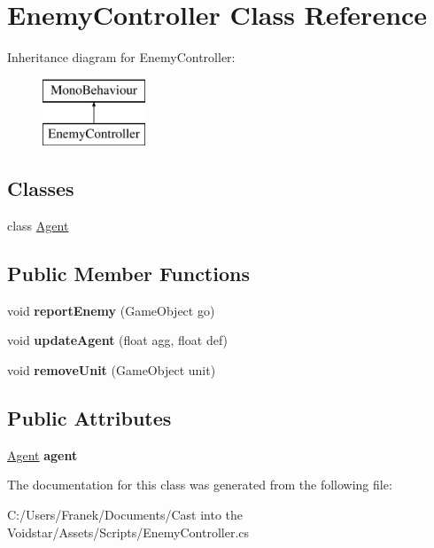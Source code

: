 \hypertarget{class_enemy_controller}{}\section{Enemy\+Controller Class Reference}
\label{class_enemy_controller}
Inheritance diagram for Enemy\+Controller\+:\begin{figure}[H]
\begin{center}
\leavevmode
\includegraphics[height=2.000000cm]{class_enemy_controller}
\end{center}
\end{figure}
\subsection*{Classes}
\begin{DoxyCompactItemize}
\item 
class \hyperlink{class_enemy_controller_1_1_agent}{Agent}
\end{DoxyCompactItemize}
\subsection*{Public Member Functions}
\begin{DoxyCompactItemize}
\item 
\hypertarget{class_enemy_controller_a068a88160e180f49bdc2da319db95b41}{}void {\bfseries report\+Enemy} (Game\+Object go)\label{class_enemy_controller_a068a88160e180f49bdc2da319db95b41}

\item 
\hypertarget{class_enemy_controller_a730852dd7b6474fe350dc9cd791a2f91}{}void {\bfseries update\+Agent} (float agg, float def)\label{class_enemy_controller_a730852dd7b6474fe350dc9cd791a2f91}

\item 
\hypertarget{class_enemy_controller_a9c542aad48c09e7fd588763014010007}{}void {\bfseries remove\+Unit} (Game\+Object unit)\label{class_enemy_controller_a9c542aad48c09e7fd588763014010007}

\end{DoxyCompactItemize}
\subsection*{Public Attributes}
\begin{DoxyCompactItemize}
\item 
\hypertarget{class_enemy_controller_a97ab04e3ac6701654fc012b8c9b0ba31}{}\hyperlink{class_enemy_controller_1_1_agent}{Agent} {\bfseries agent}\label{class_enemy_controller_a97ab04e3ac6701654fc012b8c9b0ba31}

\end{DoxyCompactItemize}


The documentation for this class was generated from the following file\+:\begin{DoxyCompactItemize}
\item 
C\+:/\+Users/\+Franek/\+Documents/\+Cast into the Voidstar/\+Assets/\+Scripts/Enemy\+Controller.\+cs\end{DoxyCompactItemize}

